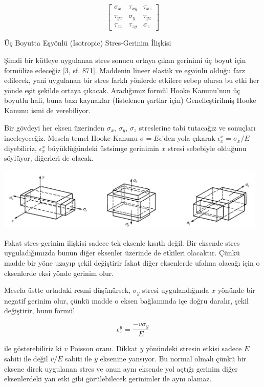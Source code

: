 \documentclass[12pt,fleqn]{article}\usepackage{../../common}
\begin{document}
$$
\left[\begin{array}{rrr}
\sigma_x & \tau_{xy} & \tau_{xz} \\
\tau_{yx} & \sigma_y & \tau_{yz} \\
\tau_{zx} & \tau_{zy} & \sigma_z
\end{array}\right]
$$

Üç Boyutta Eşyönlü (Isotropic) Stres-Gerinim İlişkisi 

Şimdi bir kütleye uygulanan stres sonucu ortaya çıkan gerinimi üç boyut için
formülize edeceğiz [3, sf. 871]. Maddenin lineer elastik ve eşyönlü olduğu farz
edilecek, yani uygulanan bir stres farklı yönlerde etkilere sebep olursa bu etki
her yönde eşit şekilde ortaya çıkacak. Aradığımız formül Hooke Kanunu'nun üç
boyutlu hali, buna bazı kaynaklar (listelenen şartlar için) Genelleştirilmiş
Hooke Kanunu ismi de verebiliyor.

Bir gövdeyi her eksen üzerinden $\sigma_x$, $\sigma_y$, $\sigma_z$ streslerine
tabi tutacağız ve sonuçları inceleyeceğiz. Mesela temel Hooke Kanunu $\sigma = E
\epsilon$'den yola çıkarak $\epsilon_x^x = \sigma_x / E$ diyebiliriz,
$\epsilon_x^x$ büyüklüğündeki üstsimge gerinimin $x$ stresi sebebiyle olduğunu
söylüyor, diğerleri de olacak.

\includegraphics[width=35em]{phy_020_strs_00_10.jpg}

Fakat stres-gerinim ilişkisi sadece tek eksenle kısıtlı değil. Bir eksende stres
uyguladığımızda bunun diğer eksenler üzerinde de etkileri olacaktır.  Çünkü
madde bir yöne uzayıp şekil değiştirir fakat diğer eksenlerde ufalma olacağı
için o eksenlerde eksi yönde gerinim olur.

Mesela üstte ortadaki resmi düşünürsek, $\sigma_y$ stresi uygulandığında $x$
yönünde bir negatif gerinim olur, çünkü madde o eksen bağlamında içe doğru
daralır, şekil değiştirir, bunu formül

$$
\epsilon_x^y =  \frac{- v \sigma_y}{E}
$$

ile gösterebiliriz ki $v$ Poisson oranı. Dikkat $y$ yönündeki stresin etkisi
sadece $E$ sabiti ile değil $v/E$ sabiti ile $y$ eksenine yansıyor. Bu normal
olmalı çünkü bir eksene direk uygulanan stres ve onun aynı eksende yol açtığı
gerinim diğer eksenlerdeki yan etki gibi görülebilecek gerinimler ile aynı
olamaz.
\end{document}
